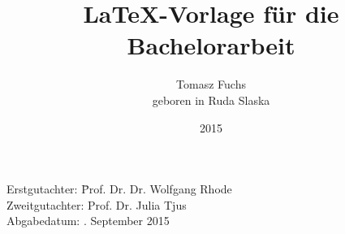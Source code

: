 





\usepackage{tikz}
\usetikzlibrary{calc, shapes, backgrounds}
\usepackage{amsmath, amssymb}

\newcommand{\thetitle}{\LaTeX-Vorlage für die Bachelorarbeit}
\newcommand{\Jahr}{2015}
\newcommand{\Geburtsort}{Castrop-Rauxel}
\newcommand{\Lehrstuhl}{Experimentelle Physik V}
\newcommand{\Betreuer}{Prof. Dr. Dr. Wolfgang Rhode}
\newcommand{\Zweitgutachter}{Prof. Dr. Julia Tjus}
\newcommand{\Abgabedatum}{31. September 2015}

\author{
    Tomasz Fuchs\\
    geboren in Ruda Slaska
}

\titlehead{
    \texttt{[image: logos/tu-logo.pdf]}
}
\title{\thetitle}
\date{\Jahr}

\subject{Arbeit zur Erlangung des akademischen Grades eines Doktors der Naturwissenschaften(Dr. rer. nat.)}
\publishers{Lehrstuhl für \Lehrstuhl \\ Fakultät Physik \\ Technische Universität Dortmund}




\frontmatter
\maketitle
\thispagestyle{empty}
\vspace*{\fill}
\begin{tabbing}
    Erstgutachter: \hspace{3em}\=   \Betreuer \\ 
    Zweitgutachter: \> \Zweitgutachter\\
    Abgabedatum: \>\Abgabedatum
\end{tabbing}
\newpage

